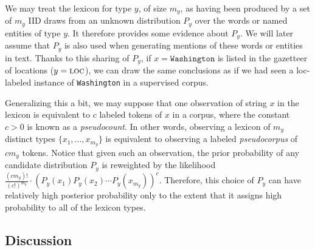 \documentclass[11pt]{article}
\begin{document}
We may treat the lexicon for type $y$, of size $m_y$, as having been produced by a set of $m_y$ IID draws from an unknown distribution $P_y$ over the words or named entities of type $y$.  It therefore provides some evidence about $P_y$.  We will later assume that $P_y$ is also used when generating mentions of these words or entities in text.
Thanks to this sharing of $P_y$, if $x=\texttt{Washington}$ is listed in the gazetteer of locations ($y=\textsc{loc}$), we can draw the same conclusions as if we had seen a {\sc loc}-labeled instance of {\tt Washington} in a supervised corpus.

Generalizing this a bit, we may suppose that one observation of string $x$ in the lexicon is equivalent to $c$ labeled tokens of $x$ in a corpus, where the constant $c > 0$ is known as a {\em pseudocount}.  In other words, observing a lexicon of $m_y$ distinct types $\{x_1,\ldots,x_{m_y}\}$ is equivalent to observing a labeled {\em pseudocorpus} of $cm_y$ tokens.  Notice that given such an observation, the prior probability of any candidate distribution $P_y$ is reweighted by the likelihood $\frac{(cm_y)!}{(c!)^{m_y}}\cdot (P_y(x_1) P_y(x_2) \cdots P_y(x_{m_y}))^c$.  Therefore, this choice of $P_y$ can have relatively high posterior probability only to the extent that it assigns high probability to all of the lexicon types.

\subsection{Discussion}
\end{document}
